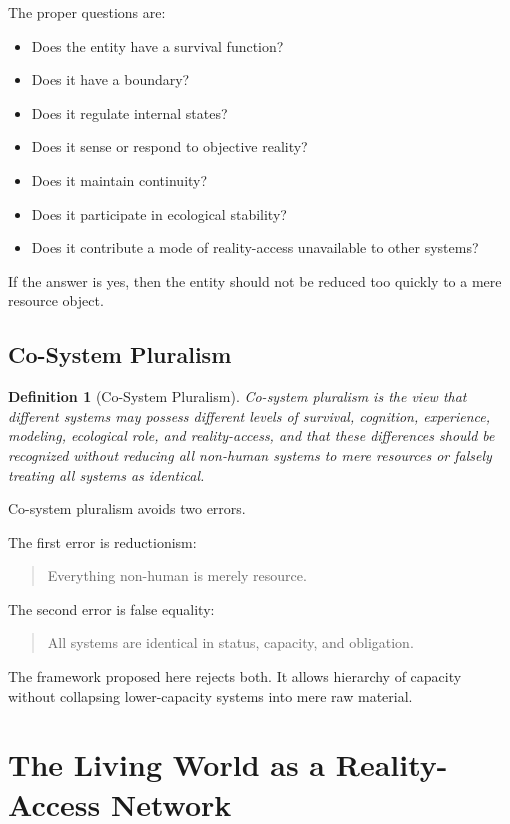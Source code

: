 \documentclass[11pt,a4paper]{article}
\newtheorem{definition}{Definition}
\begin{document}
The proper questions are:
\begin{itemize}[leftmargin=2em]
\item Does the entity have a survival function?
\item Does it have a boundary?
\item Does it regulate internal states?
\item Does it sense or respond to objective reality?
\item Does it maintain continuity?
\item Does it participate in ecological stability?
\item Does it contribute a mode of reality-access unavailable to other systems?
\end{itemize}

If the answer is yes, then the entity should not be reduced too quickly to a mere resource object.

\subsection{Co-System Pluralism}

\begin{definition}[Co-System Pluralism]
Co-system pluralism is the view that different systems may possess different levels of survival, cognition, experience, modeling, ecological role, and reality-access, and that these differences should be recognized without reducing all non-human systems to mere resources or falsely treating all systems as identical.
\end{definition}

Co-system pluralism avoids two errors.

The first error is reductionism:
\begin{quote}
Everything non-human is merely resource.
\end{quote}

The second error is false equality:
\begin{quote}
All systems are identical in status, capacity, and obligation.
\end{quote}

The framework proposed here rejects both. It allows hierarchy of capacity without collapsing lower-capacity systems into mere raw material.

\section{The Living World as a Reality-Access Network}
\end{document}
